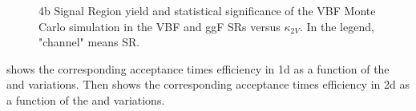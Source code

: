 \begin{figure}[h]
	\centering
	\caption{4b Signal Region yield and statistical significance of the VBF Monte Carlo simulation in the VBF and ggF SRs versus $\kappa_{2V}$.
	In the legend, "channel" means SR.
	}
	\label{fig:syield_signif_k2v}
\end{figure}

 \Fig{\ref{fig:accXeff}} shows the corresponding acceptance times efficiency in 1d as a function of the \kl and \kvv variations. 
Then \Fig{\ref{fig:eff-2d}} shows the corresponding acceptance times efficiency in 2d as a function of the \kl and \kvv variations. 

